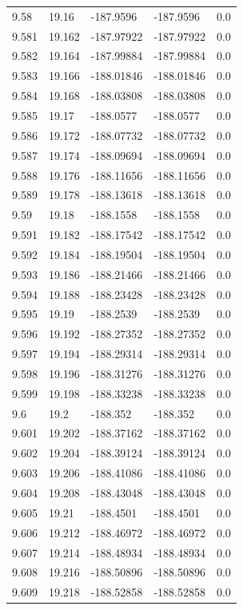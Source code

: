 \begin{tabular}{lllll}
9.58 & 19.16 & -187.9596 & -187.9596 & 0.0 \\
9.581 & 19.162 & -187.97922 & -187.97922 & 0.0 \\
9.582 & 19.164 & -187.99884 & -187.99884 & 0.0 \\
9.583 & 19.166 & -188.01846 & -188.01846 & 0.0 \\
9.584 & 19.168 & -188.03808 & -188.03808 & 0.0 \\
9.585 & 19.17 & -188.0577 & -188.0577 & 0.0 \\
9.586 & 19.172 & -188.07732 & -188.07732 & 0.0 \\
9.587 & 19.174 & -188.09694 & -188.09694 & 0.0 \\
9.588 & 19.176 & -188.11656 & -188.11656 & 0.0 \\
9.589 & 19.178 & -188.13618 & -188.13618 & 0.0 \\
9.59 & 19.18 & -188.1558 & -188.1558 & 0.0 \\
9.591 & 19.182 & -188.17542 & -188.17542 & 0.0 \\
9.592 & 19.184 & -188.19504 & -188.19504 & 0.0 \\
9.593 & 19.186 & -188.21466 & -188.21466 & 0.0 \\
9.594 & 19.188 & -188.23428 & -188.23428 & 0.0 \\
9.595 & 19.19 & -188.2539 & -188.2539 & 0.0 \\
9.596 & 19.192 & -188.27352 & -188.27352 & 0.0 \\
9.597 & 19.194 & -188.29314 & -188.29314 & 0.0 \\
9.598 & 19.196 & -188.31276 & -188.31276 & 0.0 \\
9.599 & 19.198 & -188.33238 & -188.33238 & 0.0 \\
9.6 & 19.2 & -188.352 & -188.352 & 0.0 \\
9.601 & 19.202 & -188.37162 & -188.37162 & 0.0 \\
9.602 & 19.204 & -188.39124 & -188.39124 & 0.0 \\
9.603 & 19.206 & -188.41086 & -188.41086 & 0.0 \\
9.604 & 19.208 & -188.43048 & -188.43048 & 0.0 \\
9.605 & 19.21 & -188.4501 & -188.4501 & 0.0 \\
9.606 & 19.212 & -188.46972 & -188.46972 & 0.0 \\
9.607 & 19.214 & -188.48934 & -188.48934 & 0.0 \\
9.608 & 19.216 & -188.50896 & -188.50896 & 0.0 \\
9.609 & 19.218 & -188.52858 & -188.52858 & 0.0 \\

\end{tabular}
